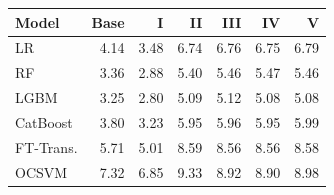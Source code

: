 \begin{tabular}{@{}lrrrrrr@{}}
\toprule
Model & Base & I & II & III & IV & V \\
\midrule
LR & 4.14 & 3.48 & 6.74 & 6.76 & 6.75 & 6.79 \\
RF & 3.36 & 2.88 & 5.40 & 5.46 & 5.47 & 5.46 \\
LGBM & 3.25 & 2.80 & 5.09 & 5.12 & 5.08 & 5.08 \\
CatBoost & 3.80 & 3.23 & 5.95 & 5.96 & 5.95 & 5.99 \\
FT-Trans. & 5.71 & 5.01 & 8.59 & 8.56 & 8.56 & 8.58 \\
OCSVM & 7.32 & 6.85 & 9.33 & 8.92 & 8.90 & 8.98 \\
\bottomrule
\end{tabular}
